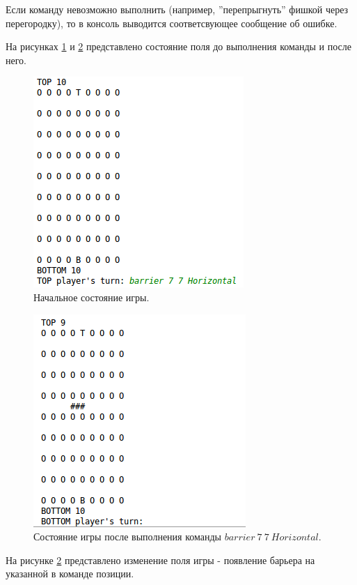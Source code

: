 \documentclass[a4paper]{article}
\begin{document}
Если команду невозможно выполнить (например, ''перепрыгнуть'' фишкой через перегородку), то в консоль выводится соответсвующее сообщение об ошибке.

На рисунках \ref{pic:console1} и \ref{pic:console2} представлено состояние поля до выполнения команды и после него. 

\begin{figure}[H]
	\begin{center}
		\includegraphics[scale=0.5]{console1}
		\caption{Начальное состояние игры.} 
		\label{pic:console1} %
	\end{center}
\end{figure}

\begin{figure}[H]
	\begin{center}
		\includegraphics[scale=0.5]{console2}
		\caption{Состояние игры после выполнения команды $barrier~7~7~Horizontal$.} 
		\label{pic:console2} %
	\end{center}
\end{figure}
На рисунке \ref{pic:console2} представлено изменение поля игры - появление барьера на указанной в команде позиции.
\end{document}
